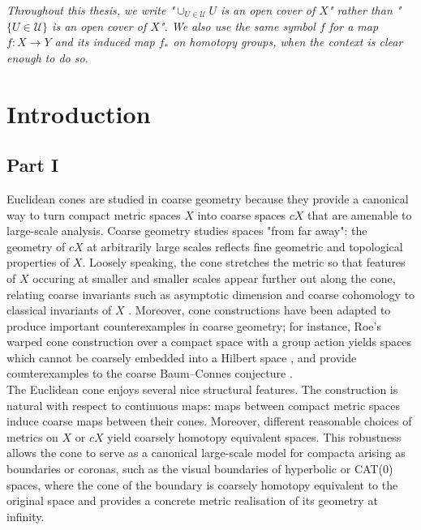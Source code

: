\documentclass[a4paper,11pt]{article}
\theoremstyle{definition}
\theoremstyle{plain}
\theoremstyle{remark}
\begin{document}
\newpage

\textit{Throughout this thesis, we write "$\cup_{U\in \mathcal{U}} U$ is an open cover of $X$" rather than "$\{U\in \mathcal{U}\}$ is an open cover of $X$". We also use the same symbol $f$ for a map $f: X\rightarrow Y$ and its induced map $f_{\ast}$ on homotopy groups, when the context is clear enough to do so.}

\newpage
 






\section{Introduction}


%


\subsection{Part I}

Euclidean cones are studied in coarse geometry because they provide a canonical way to turn compact metric spaces $X$ into coarse spaces $cX$ that are amenable to large-scale analysis. Coarse geometry studies spaces "from far away": the geometry of $cX$ at arbitrarily large scales reflects fine geometric and topological properties of $X$. Loosely speaking, the cone stretches the metric so that features of $X$ occuring at smaller and smaller scales appear further out along the cone, relating coarse invariants such as asymptotic dimension and coarse cohomology to classical invariants of $X$ \cite{engel2021coronasproperlycombablespaces}. Moreover, cone constructions have been adapted to produce important counterexamples in coarse geometry; for instance, Roe’s warped cone construction over a compact space with a group action yields spaces which cannot be coarsely embedded into a Hilbert space \cite{RoeWarped05}, and provide counterexamples to the coarse Baum–Connes conjecture \cite{kitsios2025coarsebaumconneswarpedcones}.\\


The Euclidean cone enjoys several nice structural features. The construction is natural with respect to continuous maps: maps between compact metric spaces induce coarse maps between their cones. Moreover, different reasonable choices of metrics on $X$ or $cX$ yield coarsely homotopy equivalent spaces. This robustness allows the cone to serve as a canonical large-scale model for compacta arising as boundaries or coronas, such as the visual boundaries of hyperbolic or CAT(0) spaces, where the cone of the boundary is coarsely homotopy equivalent to the original space and provides a concrete metric realisation of its geometry at infinity. \\
\end{document}
